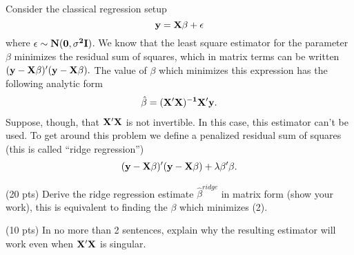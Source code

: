 \documentclass[12pt]{article}
\begin{document}
 {
Consider the classical regression setup
\[\bf{y}=\bf{X}\bf{\beta}+\bf{\epsilon}\]
where $\bf{\epsilon}\sim N(\bf{0},\sigma^2\bf{I})$. We know that the least square estimator for the parameter $\beta$ minimizes the residual sum of squares, which in matrix terms can be written $(\bf{y}-\bf{X}\beta)'(\bf{y}-\bf{X}\beta).$  The value of $\beta$ which minimizes this expression has the following analytic form
\begin{eqnarray}
\hat{\beta}=(\bf{X}'\bf{X})^{-1}\bf{X}'\bf{y}.
\end{eqnarray}
Suppose, though, that $\bf X'X$ is not invertible. In this case, this estimator can't be used.  To get around this problem we define a penalized residual sum of squares (this is called ``ridge regression'')
\begin{eqnarray}
(\bf{y}-\bf{X}\beta)'(\bf{y}-\bf{X}\beta)+\lambda \beta'\beta.
\label{ridge}
\end{eqnarray}


\abcs
\item (20 pts) Derive the ridge regression estimate $\hat{\beta}^{ridge}$ in matrix form (show your work), this is equivalent to finding the $\beta$ which minimizes (2).
\item  (10 pts) In no more than 2 sentences, explain why the resulting estimator will work even when  $\bf X'X$ is singular.

\endabcs
}
 { \vfill
  \answer
} {  }
\end{document}
